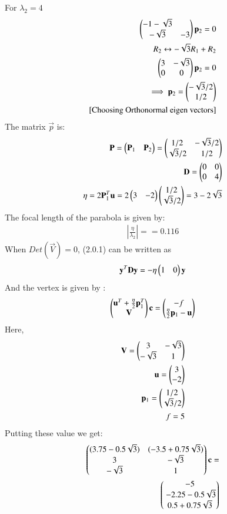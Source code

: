 \documentclass[journal,12pt,twocolumn]{IEEEtran}
\begin{document}
For $\lambda_2=4$
\begin{align}
    \begin{pmatrix}-1 -\sqrt{3} \\-\sqrt{3} &-3\end{pmatrix}\mathbf{p}_2=0 \\
    R_2\leftrightarrow -\sqrt{3}R_1+R_2 \nonumber\\
    \begin{pmatrix}3 & -\sqrt{3} \\0 & 0\end{pmatrix}\mathbf{p}_2=0 \\
    \implies \mathbf{p}_2=\begin{pmatrix}-\sqrt{3}/2 \\ 1/2\end{pmatrix} \\
    \text{[Choosing Orthonormal eigen vectors]} \nonumber
\end{align}
The matrix $\vec{p}$ is: 
\begin{align}
    \mathbf{P}=\begin{pmatrix} \mathbf{P}_1& \mathbf{P}_2\end{pmatrix}=\begin{pmatrix}1/2 &-\sqrt{3}/2 \\\sqrt{3}/2& 1/2\end{pmatrix}\\
    \mathbf{D}=\begin{pmatrix}0 &0 \\0& 4\end{pmatrix}\\
    \eta=2\mathbf{P}_1^T\mathbf{u}=2\begin{pmatrix}3 & -2\end{pmatrix} \begin{pmatrix}1/2\\ \sqrt{3}/2\end{pmatrix} = 3-2\sqrt{3}
\end{align}
The focal length of the parabola is given by:
\begin{align}
\left |\frac{\eta}{\lambda_2}\right |==0.116
\end{align}
When $Det(\vec{V})= 0$, (2.0.1) can be written as
\begin{align}
\mathbf{y}^T\mathbf{D}\mathbf{y}=-\eta \begin{pmatrix}1 & 0\end{pmatrix}\mathbf{y}
\end{align}
And the vertex  is given by : 
\begin{align}
\begin{pmatrix}\mathbf{u}^T + \frac{\eta}{2} \mathbf{p}_1^T \\ \mathbf{V} \end{pmatrix}\mathbf{c}=\begin{pmatrix} -f\\ \frac{\eta}{2} \mathbf{p}_1-\mathbf{u} \end{pmatrix}
\end{align}
Here,
\begin{align}
\mathbf{V}=\begin{pmatrix}3 & -\sqrt{3} \\-\sqrt{3} & 1\end{pmatrix}\\
\mathbf{u}=\begin{pmatrix}3 \\ -2\end{pmatrix}\\
\mathbf{p}_1=\begin{pmatrix}1/2 \\ \sqrt{3}/2\end{pmatrix}\\
f=5
\end{align}
Putting these value we get:
\begin{align}
\myvec{(3.75-0.5\sqrt{3}) & (-3.5+0.75\sqrt{3})\\3 & -\sqrt{3} \\-\sqrt{3} & 1  }\vec{c}= \nonumber \\ \myvec{ -5\\ \ -2.25-0.5\sqrt{3} \\ 0.5+0.75\sqrt{3}} 
\end{align}
\end{document}
